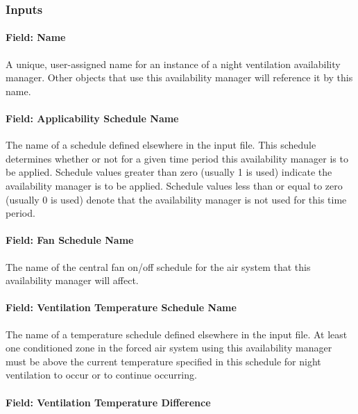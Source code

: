 \subsubsection{Inputs}\label{inputs-9-023}

\paragraph{Field: Name}\label{field-name-8-021}

A unique, user-assigned name for an instance of a night ventilation availability manager. Other objects that use this availability manager will reference it by this name.

\paragraph{Field: Applicability Schedule Name}\label{field-applicability-schedule-name-1}

The name of a schedule defined elsewhere in the input file. This schedule determines whether or not for a given time period this availability manager is to be applied. Schedule values greater than zero (usually 1 is used) indicate the availability manager is to be applied. Schedule values less than or equal to zero (usually 0 is used) denote that the availability manager is not used for this time period.

\paragraph{Field: Fan Schedule Name}\label{field-fan-schedule-name}

The name of the central fan on/off schedule for the air system that this availability manager will affect.

\paragraph{Field: Ventilation Temperature Schedule Name}\label{field-ventilation-temperature-schedule-name}

The name of a temperature schedule defined elsewhere in the input file. At least one conditioned zone in the forced air system using this availability manager must be above the current temperature specified in this schedule for night ventilation to occur or to continue occurring.

\paragraph{Field: Ventilation Temperature Difference}\label{field-ventilation-temperature-difference}

